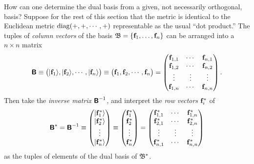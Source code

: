 How can one determine the dual basis from a given,
not necessarily orthogonal, basis?
Suppose for the rest of this section that the metric is identical to the Euclidean metric ${\rm diag}(+,+,\cdots ,+)$ representable as the usual ``dot product.''
The tuples of {\em column vectors} of the basis ${\frak B} = \{{\bf f}_1,\ldots , {\bf f}_n\}$
can be arranged into a $n \times n$ matrix
\begin{equation}
\textsf{\textbf{B}}
\equiv
\begin{pmatrix} \vert {\bf f}_{1} \rangle , \vert {\bf f}_{2}\rangle , \cdots ,\vert  {\bf f}_{n}\rangle \end{pmatrix}
\equiv
\begin{pmatrix} {\bf f}_{1} , {\bf f}_{2}, \cdots , {\bf f}_{n} \end{pmatrix}
=
\begin{pmatrix}
{\bf f}_{1,1}&\cdots & {\bf f}_{n,1}\\
{\bf f}_{1,2}&\cdots & {\bf f}_{n,2}\\
\vdots&\vdots & \vdots \\
{\bf f}_{1,n}&\cdots & {\bf f}_{n,n}
\end{pmatrix}
.
\end{equation}
Then take the
{\em inverse matrix}
$\textsf{\textbf{B}}^{-1}$,
and interpret the
{\em row vectors} ${\bf f}_{i}^\ast$ of
\begin{equation}
\begin{split}
\textsf{\textbf{B}}^{\ast}=\textsf{\textbf{B}}^{-1}
\equiv
\begin{pmatrix}
\vert {\bf f}_{1}^\ast \rangle\\
\vert {\bf f}_{2}^\ast \rangle\\
\vdots  \\
\vert {\bf f}_{n}^\ast \rangle
\end{pmatrix}
\equiv
\begin{pmatrix}
{\bf f}_{1}^\ast\\
{\bf f}_{2}^\ast\\
\vdots  \\
{\bf f}_{n}^\ast
\end{pmatrix}
=
\begin{pmatrix}
{\bf f}_{1,1}^\ast&\cdots & {\bf f}_{1,n}^\ast\\
{\bf f}_{2,1}^\ast&\cdots & {\bf f}_{2,n}^\ast\\
\vdots&\vdots & \vdots \\
{\bf f}_{n,1}^\ast&\cdots & {\bf f}_{n,n}^\ast
\end{pmatrix}
\end{split}
\end{equation}
as the tuples of elements of the dual basis of ${\frak B}^*$.

